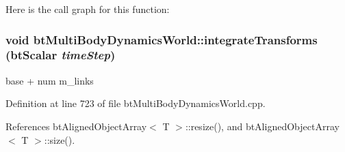 Here is the call graph for this function:\hypertarget{classbt_multi_body_dynamics_world_6abe9896c6178b8d5bebdbca53fa7a74}{
\subsubsection[integrateTransforms]{\setlength{\rightskip}{0pt plus 5cm}void btMultiBodyDynamicsWorld::integrateTransforms (btScalar {\em timeStep})}}
\label{classbt_multi_body_dynamics_world_6abe9896c6178b8d5bebdbca53fa7a74}




base + num m\_\-links 

Definition at line 723 of file btMultiBodyDynamicsWorld.cpp.

References btAlignedObjectArray$<$ T $>$::resize(), and btAlignedObjectArray$<$ T $>$::size().


